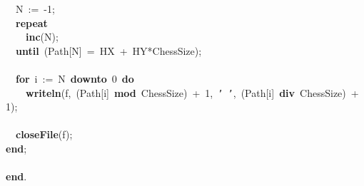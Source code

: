 \mbox{}\ \ N\ :=\ -1; \\
\mbox{}\ \ \textbf{repeat} \\
\mbox{}\ \ \ \ \textbf{inc}(N); \\
\mbox{}\ \ \textbf{until}\ (Path[N]\ =\ HX\ +\ HY*ChessSize); \\
\mbox{} \\
\mbox{}\ \ \textbf{for}\ i\ :=\ N\ \textbf{downto}\ 0\ \textbf{do} \\
\mbox{}\ \ \ \ \textbf{writeln}(f,\ (Path[i]\ \textbf{mod}\ ChessSize)\ +\ 1,\ \texttt{'\ '},\ (Path[i]\ \textbf{div}\ ChessSize)\ +\ 1); \\
\mbox{} \\
\mbox{}\ \ \textbf{closeFile}(f); \\
\mbox{}\textbf{end}; \\
\mbox{} \\
\mbox{}\textbf{end}. \\
\mbox{} \\
\mbox{}

